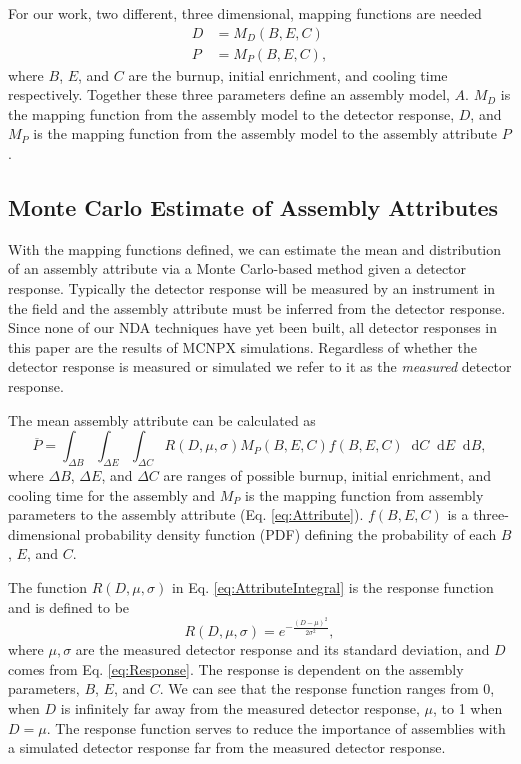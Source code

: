 \documentclass{ansnse}
\newcommand{\dd}{\ensuremath{\mathop{}\!\mathrm{d}}}
\begin{document}
For our work, two different, three dimensional, mapping functions are needed
\begin{subequations}
    \label{eq:Maps}
    \begin{align}
        D &= M_{D}(B, E, C) \label{eq:Response} \\
        P &= M_{P}(B, E, C), \label{eq:Attribute}
    \end{align}
\end{subequations}
where $B$, $E$, and $C$ are the burnup, initial enrichment, and cooling time respectively.  Together these three parameters define an assembly model, $A$.  $M_{D}$ is the mapping function from the assembly model to the detector response, $D$, and $M_{P}$ is the mapping function from the assembly model to the assembly attribute $P$.  

\subsection{Monte Carlo Estimate of Assembly Attributes}
With the mapping functions defined, we can estimate the mean and distribution of an assembly attribute via a Monte Carlo-based method given a detector response.  Typically the detector response will be measured by an instrument in the field and the assembly attribute must be inferred from the detector response.  Since none of our NDA techniques have yet been built, all detector responses in this paper are the results of MCNPX simulations.  Regardless of whether the detector response is measured or simulated we refer to it as the \emph{measured} detector response.

The mean assembly attribute can be calculated as
\begin{equation}
    \overline{P} = \int_{\Delta B}\int_{\Delta E}\int_{\Delta C} R(D, \mu, \sigma) M_{P}(B, E, C)f(B,E,C) \dd C \dd E \dd B,
    \label{eq:AttributeIntegral}
\end{equation}
where $\Delta B$, $\Delta E$, and $\Delta C$ are ranges of possible burnup, initial enrichment, and cooling time for the assembly and $M_{P}$ is the mapping function from assembly parameters to the assembly attribute (Eq. \eqref{eq:Attribute}).  $f(B,E,C)$ is a three-dimensional probability density function (PDF) defining the probability of each $B$, $E$, and $C$.  

The function $R\left(D,\mu,\sigma\right)$ in Eq. \eqref{eq:AttributeIntegral} is the response function and is defined to be
\begin{equation}
    R(D, \mu,\sigma) = e^{-\frac{(D-\mu)^{2}}{2\sigma^{2}}},
    \label{eq:ResponseWeight}
\end{equation}
where $\mu, \sigma$ are the measured detector response and its standard deviation, and $D$ comes from Eq. \eqref{eq:Response}.  The response is dependent on the assembly parameters, $B$, $E$, and $C$.  We can see that the response function ranges from 0, when $D$ is infinitely far away from the measured detector response, $\mu$, to 1 when $D = \mu$.  The response function serves to reduce the importance of assemblies with a simulated detector response far from the measured detector response.  
\end{document}

